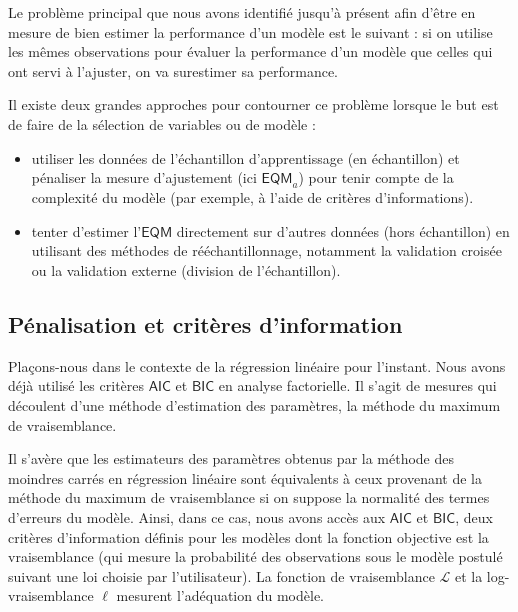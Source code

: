 \documentclass[
  11pt,
  letterpaper,
]{book}
\providecommand{\tightlist}{%
  \setlength{\itemsep}{0pt}\setlength{\parskip}{0pt}}\usepackage{longtable,booktabs,array}
\theoremstyle{definition}
\theoremstyle{remark}
\begin{document}
Le problème principal que nous avons identifié jusqu'à présent afin
d'être en mesure de bien estimer la performance d'un modèle est le
suivant : si on utilise les mêmes observations pour évaluer la
performance d'un modèle que celles qui ont servi à l'ajuster, on va
surestimer sa performance.

Il existe deux grandes approches pour contourner ce problème lorsque le
but est de faire de la sélection de variables ou de modèle :

\begin{itemize}
\tightlist
\item
  utiliser les données de l'échantillon d'apprentissage (en échantillon)
  et pénaliser la mesure d'ajustement (ici \(\widehat{\mathsf{EQM}}_a\))
  pour tenir compte de la complexité du modèle (par exemple, à l'aide de
  critères d'informations).
\item
  tenter d'estimer l'\(\mathsf{EQM}\) directement sur d'autres données
  (hors échantillon) en utilisant des méthodes de rééchantillonnage,
  notamment la validation croisée ou la validation externe (division de
  l'échantillon).
\end{itemize}

\hypertarget{puxe9nalisation-et-crituxe8res-dinformation}{%
\subsection{Pénalisation et critères
d'information}\label{puxe9nalisation-et-crituxe8res-dinformation}}

Plaçons-nous dans le contexte de la régression linéaire pour l'instant.
Nous avons déjà utilisé les critères \(\mathsf{AIC}\) et
\(\mathsf{BIC}\) en analyse factorielle. Il s'agit de mesures qui
découlent d'une méthode d'estimation des paramètres, la méthode du
maximum de vraisemblance.

Il s'avère que les estimateurs des paramètres obtenus par la méthode des
moindres carrés en régression linéaire sont équivalents à ceux provenant
de la méthode du maximum de vraisemblance si on suppose la normalité des
termes d'erreurs du modèle. Ainsi, dans ce cas, nous avons accès aux
\(\mathsf{AIC}\) et \(\mathsf{BIC}\), deux critères d'information
définis pour les modèles dont la fonction objective est la vraisemblance
(qui mesure la probabilité des observations sous le modèle postulé
suivant une loi choisie par l'utilisateur). La fonction de vraisemblance
\(\mathcal{L}\) et la log-vraisemblance \(\ell\) mesurent l'adéquation
du modèle.
\end{document}
